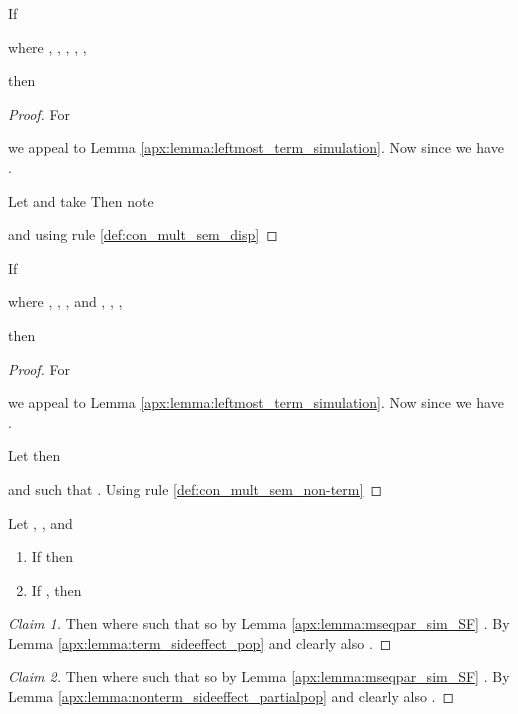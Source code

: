 \begin{lemma}\label{apx:lemma:term_sideeffect_pop}
If 
 
where , 
	  , 
	  , 
	  , 
	  , 
	  
then 

\end{lemma}
\begin{proof}
For
 
we appeal to Lemma \ref{apx:lemma:leftmost_term_simulation}.
Now since  we have 
.

Let  and
take 
Then note
 
and using rule \ref{def:con_mult_sem_disp}

\end{proof}

\begin{lemma}\label{apx:lemma:nonterm_sideeffect_partialpop}
If 
 
where , 
	  , 
	  , 
	   and
	  , 
	  ,
	  , 
	  
then 

\end{lemma}
\begin{proof}
For
 
we appeal to Lemma \ref{apx:lemma:leftmost_term_simulation}.
Now since  we have 
.

Let  then


and
 such that .
Using rule \ref{def:con_mult_sem_non-term}

\end{proof}

\begin{lemma}\label{apx:lemma:sim_fromcom_pop_or_nonterm}
Let , ,  and 
\begin{enumerate}
	\item If 
	      then 
	      
	\item If , then 
\end{enumerate}
\end{lemma}
\begin{proof}[Claim 1]
Then  where 
 such that  
so by Lemma \ref{apx:lemma:mseqpar_sim_SF} .
By Lemma \ref{apx:lemma:term_sideeffect_pop}
 and clearly also .
\end{proof}
\begin{proof}[Claim 2]
Then  where 
 such that  
so by Lemma \ref{apx:lemma:mseqpar_sim_SF} .
By Lemma \ref{apx:lemma:nonterm_sideeffect_partialpop}
 and clearly also .
\end{proof}

